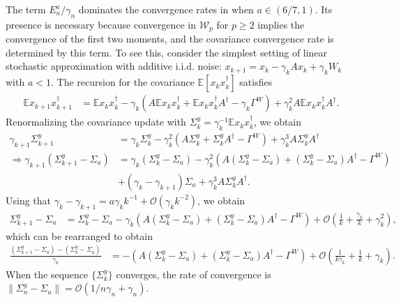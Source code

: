 \documentclass[11pt]{article}
\begin{document}
The term $E_n^a/\gamma_n$ dominates the convergence rates in  when $a \in (6/7, 1)$. 
Its presence is necessary because convergence in $\mathcal{W}_p$ for $p \geq 2$ implies the convergence of the first two moments, and the covariance convergence rate is determined by this term. 
To see this, consider the simplest setting of linear stochastic approximation with additive i.i.d. noise: $x_{k+1} = x_k - \gamma_k A x_k + \gamma_k W_k$ with $a < 1$.
The recursion for the covariance $\mathbb{E}[x_k x_k^\dagger]$ satisfies
\begin{align*}
    \mathbb{E} x_{k+1} x_{k+1}^\dagger &= \mathbb{E}x_k x_k^\dagger - \gamma_k \left(A \mathbb{E} x_k x_k^\dagger + \mathbb{E}x_k x_k^\dagger A^\dagger - \gamma_k \Gamma^W \right)
    + \gamma_k^2 A \mathbb{E} x_k x_k^\dagger A^\dagger
    .
\end{align*}
Renormalizing the covariance update with $\Sigma_k^y = \gamma_k^{-1} \mathbb{E}x_k x_k^\dagger$, we obtain
\begin{align*}
    \gamma_{k+1} \Sigma_{k+1}^y &= \gamma_k \Sigma_k^y - \gamma_k^2 \left(A \Sigma_k^y + \Sigma_k^y A^\dagger - \Gamma^W \right) + \gamma_k^3 A \Sigma_k^y A^\dagger 
    \\
    \Rightarrow 
    \gamma_{k+1}\left( \Sigma_{k+1}^y  - \Sigma_a\right) &= \gamma_k (\Sigma_k^y - \Sigma_a)  
    - \gamma_k^2 \left(A (\Sigma_k^y - \Sigma_a) + (\Sigma_k^y - \Sigma_a) A^\dagger - \Gamma^W\right)
    \\ &
    + (\gamma_k - \gamma_{k+1}) \Sigma_a
    + \gamma_k^3 A \Sigma_k^y A^\dagger 
    . 
\end{align*}
Using that $\gamma_k - \gamma_{k+1} = a \gamma_k k^{-1} + \mathcal{O}(\gamma_k k^{-2})$, we obtain
\begin{align*}
    \Sigma_{k+1}^y - \Sigma_a &= 
    \Sigma_k^y - \Sigma_a - \gamma_k (A (\Sigma_k^y - \Sigma_a) + (\Sigma_k^y - \Sigma_a) A^\dagger - \Gamma^W)
    +
    \mathcal{O}\left(\frac{1}{k} + \frac{\gamma_k}{k} + \gamma_k^2 \right) 
    ,
\end{align*}
which can be rearranged to obtain
\begin{align*}
    \frac{(\Sigma_{k+1}^y - \Sigma_a) - (\Sigma_k^y - \Sigma_a)}{\gamma_k}
    &= - (A (\Sigma_k^y - \Sigma_a) + (\Sigma_k^y - \Sigma_a) A^\dagger - \Gamma^W)
    + \mathcal{O}\left(\frac{1}{k \gamma_k}+ \frac{1}{k} + \gamma_k\right) . 
\end{align*}
When the sequence $\{\Sigma^y_k\}$ converges, the rate of convergence is $\lVert \Sigma_n^y - \Sigma_a \rVert = \mathcal{O}(1/n\gamma_n + \gamma_n)$.
\end{document}
